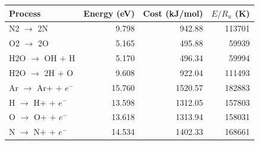 \begin{tabular}{lrrr}\toprule
Process & Energy (eV) & Cost (kJ/mol) & $E/R_u$ (K) \\
\midrule
N2 $\to$ 2N & 9.798 & 942.88 & 113701 \\
O2 $\to$ 2O & 5.165 & 495.88 & 59939 \\
H2O $\to$ OH $+$ H & 5.170 & 496.34 & 59994 \\
H2O $\to$ 2H $+$ O & 9.608 & 922.04 & 111493 \\
Ar $\to$ Ar$+$ $+$ $e^-$ & 15.760 & 1520.57 & 182883 \\
H $\to$ H$+$ $+$ $e^-$ & 13.598 & 1312.05 & 157803 \\
O $\to$ O$+$ $+$ $e^-$ & 13.618 & 1313.94 & 158031 \\
N $\to$ N$+$ $+$ $e^-$ & 14.534 & 1402.33 & 168661 \\
\bottomrule\end{tabular}
